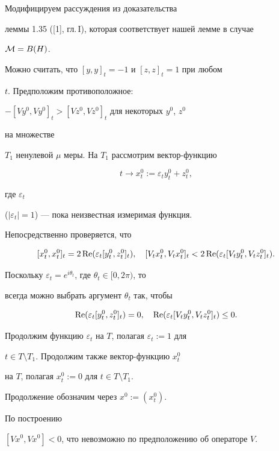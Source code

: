\begin{pf}


Модифицируем рассуждения из доказательства 


леммы 1.35 ([1], гл.\,I), которая соответствует нашей лемме в случае 


${\cal M}=B(H)$.


Можно считать, что $[y,y]_{t}=-1$ и $[z,z]_{t}=1$ при любом


$t$. Предположим противоположное:


$-[Vy^{0},Vy^{0}]_{t}>[Vz^{0},Vz^{0}]_{t}$ для некоторых $y^{0}$, $z^{0}$


на множестве


$T_{1}$ ненулевой $\mu$ меры. На $T_{1}$ рассмотрим вектор-функцию


$$


t\to x^{0}_{t}:=\varepsilon_{t}y^{0}_{t}+z^{0}_{t},


$$


где $\varepsilon_{t}$


($| \varepsilon_{t}| =1$) --- пока неизвестная измеримая функция.


Непосредственно проверяется, что


$$


[x^{0}_{t},x^{0}_{t}]_{t}=2\re (\varepsilon_{t}[y^{0}_{t},z^{0}_{t}]_{t}),


\quad


[V_{t}x^{0}_{t},V_{t}x^{0}_{t}]_{t}<2\re (\varepsilon_{t}[V_{t}y^{0}_{t},


V_{t}z^{0}_{t}]_{t}).


$$


Поскольку $\varepsilon_{t}=e^{i\theta_{t}}$, где $\theta_{t}\in [0,2\pi )$, то


всегда можно выбрать аргумент $\theta_{t}$ так, чтобы


$$


\re (\varepsilon_{t}[y^{0}_{t},z^{0}_{t}]_{t})=0,\quad


\re (\varepsilon_{t}[V_{t}y^{0}_{t},V_{t}z^{0}_{t}]_{t})\leq 0.


$$


Продолжим функцию $\varepsilon_{t}$ на $T$, полагая $\varepsilon_{t}:=1$ для


$t\in T\setminus T_{1}$. Продолжим также вектор-функцию $x^{0}_{t}$


на $T$, полагая $x^{0}_{t}:=0$ для $t\in T\setminus T_{1}$.


Продолжение обозначим через $x^{0}:=(x^{0}_{t})$.


По построению


$[Vx^{0},Vx^{0}]<0$, что невозможно по предположению об операторе $V$.


\end{pf}








